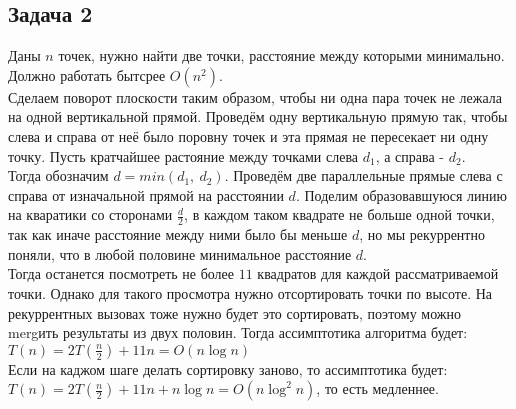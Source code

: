 \documentclass[12pt, a4paper]{article}
\begin{document}
    \subsection*{Задача 2}
    Даны $n$ точек, нужно найти две точки, расстояние между которыми минимально. Должно работать бытсрее $O(n^2)$.\\
    Сделаем поворот плоскости таким образом, чтобы ни одна пара точек не лежала на одной вертикальной прямой. Проведём 
    одну вертикальную прямую так, чтобы слева и справа от неё было поровну точек и эта прямая не пересекает ни одну точку. 
    Пусть кратчайшее растояние между точками слева $d_1$, а справа - $d_2$.\\
    Тогда обозначим $d = min(d_1,\ d_2)$. Проведём две параллельные прямые слева с справа от изначальной прямой
    на расстоянии $d$. Поделим образовавшуюся линию на кваратики со сторонами $\frac{d}{2}$, в каждом таком квадрате не 
    больше одной точки, так как иначе расстояние между ними было бы меньше $d$, но мы рекуррентно поняли, что в любой половине минимальное расстояние $d$.\\
    Тогда останется посмотреть не более $11$ квадратов для каждой рассматриваемой точки. Однако для такого просмотра нужно отсортировать точки по высоте. 
    На рекуррентных вызовах тоже нужно будет это сортировать, поэтому можно mergить результаты из двух половин. Тогда ассимптотика алгоритма будет:\\
    $T(n) = 2T(\frac{n}{2}) + 11n = O(n\log n)$\\
    Если на каджом шаге делать сортировку заново, то ассимптотика будет:\\
    $T(n) = 2T(\frac{n}{2}) + 11n + n\log n = O(n\log^2 n)$, то есть медленнее.
\end{document}
